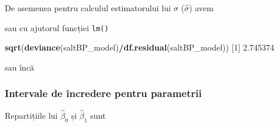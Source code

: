\documentclass[]{article}
\newenvironment{Shaded}{\begin{snugshade}}{\end{snugshade}}
\newcommand{\KeywordTok}[1]{\textcolor[rgb]{0.13,0.29,0.53}{\textbf{#1}}}
\newcommand{\DecValTok}[1]{\textcolor[rgb]{0.00,0.00,0.81}{#1}}
\newcommand{\FloatTok}[1]{\textcolor[rgb]{0.00,0.00,0.81}{#1}}
\newcommand{\StringTok}[1]{\textcolor[rgb]{0.31,0.60,0.02}{#1}}
\newcommand{\OperatorTok}[1]{\textcolor[rgb]{0.81,0.36,0.00}{\textbf{#1}}}
\newcommand{\NormalTok}[1]{#1}
\begin{document}
De asemenea pentru calculul estimatorului lui \(\sigma\)
(\(\hat{\sigma}\)) avem

\begin{Shaded}
\end{Shaded}

sau cu ajutorul funcției \texttt{lm()}

\begin{Shaded}
\begin{Highlighting}[]
\KeywordTok{sqrt}\NormalTok{(}\KeywordTok{deviance}\NormalTok{(saltBP_model)}\OperatorTok{/}\KeywordTok{df.residual}\NormalTok{(saltBP_model))}
\NormalTok{[}\DecValTok{1}\NormalTok{] }\FloatTok{2.745374}
\end{Highlighting}
\end{Shaded}

sau încă

\begin{Shaded}
\end{Shaded}

\subsubsection{Intervale de încredere pentru
parametrii}\label{intervale-de-incredere-pentru-parametrii}

Repartițiile lui \(\hat\beta_0\) și \(\hat\beta_1\) sunt
\end{document}
